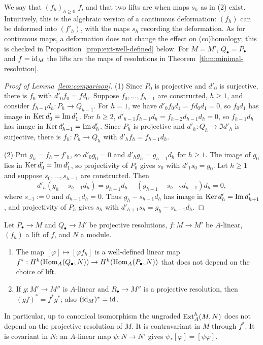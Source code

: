 We say that $(f_h)_{h\geq0}$  $f$, and that two lifts are  when maps $s_h$ as in (2) exist.
Intuitively, this is the algebraic version of a continuous deformation: $(f_h)$ can be deformed into $(f'_h)$, with the maps $s_h$ recording the deformation.
As for continuous maps, a deformation does not change the effect on (co)homology; this is checked in Proposition~\ref{prop:ext-well-defined} below.
For $M=M'$, $Q_\bullet=P_\bullet$ and $f=\operatorname{id}_M$ the lifts are the maps of resolutions in Theorem~\ref{thm:minimal-resolution}.

\begin{supplementary}
\begin{proof}[Proof of Lemma~\ref{lem:comparison}]
(1) Since $P_0$ is projective and $d'_0$ is surjective, there is $f_0$ with $d'_0f_0=fd_0$.
Suppose $f_0,\ldots,f_{h-1}$ are constructed, $h\geq1$, and consider $f_{h-1}d_h:P_h\to Q_{h-1}$.
For $h=1$, we have $d'_0f_0d_1=fd_0d_1=0$, so $f_0d_1$ has image in $\operatorname{Ker}\nolimits d'_0=\operatorname{Im}\nolimits d'_1$.
For $h\geq2$, $d'_{h-1}f_{h-1}d_h=f_{h-2}d_{h-1}d_h=0$, so $f_{h-1}d_h$ has image in $\operatorname{Ker}\nolimits d'_{h-1}=\operatorname{Im}\nolimits d'_h$.
Since $P_h$ is projective and $d'_h:Q_h\to\Im d'_h$ is surjective, there is $f_h:P_h\to Q_h$ with $d'_hf_h=f_{h-1}d_h$.

(2) Put $g_h=f_h-f'_h$, so $d'_0g_0=0$ and $d'_hg_h=g_{h-1}d_h$ for $h\geq1$.
The image of $g_0$ lies in $\operatorname{Ker}\nolimits d'_0=\operatorname{Im}\nolimits d'_1$, so projectivity of $P_0$ gives $s_0$ with $d'_1s_0=g_0$.
Let $h\geq1$ and suppose $s_0,\ldots,s_{h-1}$ are constructed.
Then
\[
d'_h(g_h-s_{h-1}d_h)=g_{h-1}d_h-(g_{h-1}-s_{h-2}d_{h-1})d_h=0,
\]
where $s_{-1}:=0$ and $d_{h-1}d_h=0$.
Thus $g_h-s_{h-1}d_h$ has image in $\operatorname{Ker}\nolimits d'_h=\operatorname{Im}\nolimits d'_{h+1}$, and projectivity of $P_h$ gives $s_h$ with $d'_{h+1}s_h=g_h-s_{h-1}d_h$.
\end{proof}
\end{supplementary}

\begin{proposition}\label{prop:ext-well-defined}
Let $P_\bullet\to M$ and $Q_\bullet\to M'$ be projective resolutions, $f:M\to M'$ be $A$-linear, $(f_h)$ a lift of $f$, and $N$ a module.
\begin{enumerate}
\item The map $[\varphi]\mapsto[\varphi f_h]$ is a well-defined linear map $f^*:H^h(\operatorname{Hom}\nolimits_A(Q_\bullet,N))\to H^h(\operatorname{Hom}\nolimits_A(P_\bullet,N))$ that does not depend on the choice of lift.
\item If $g:M'\to M''$ is $A$-linear and $R_\bullet\to M''$ is a projective resolution, then $(gf)^*=f^*g^*$; also $(\operatorname{id}_M)^*=\operatorname{id}$.
\end{enumerate}
In particular, up to canonical isomorphism the ungraded $\operatorname{Ext}\nolimits_A^h(M,N)$ does not depend on the projective resolution of $M$.
It is contravariant in $M$ through $f^*$.
It is covariant in $N$: an $A$-linear map $\psi:N\to N'$ gives $\psi_*[\varphi]=[\psi\varphi]$.
\end{proposition}

